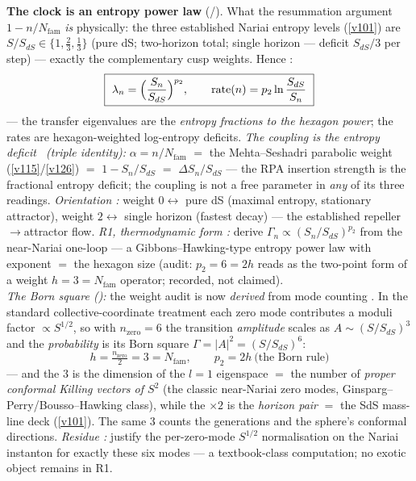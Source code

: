 \documentclass[11pt,a4paper]{article}
\newcommand{\Nfam}{N_{\mathrm{fam}}}
\begin{document}
\par\smallskip\noindent\textbf{The clock is an entropy power law} (\mE/\mC).
What the resummation argument $1-n/\Nfam$ \emph{is} physically: the three established Nariai entropy
levels (\vref{v101}) are $S/S_{dS}\in\{1,\tfrac23,\tfrac13\}$ (pure dS; two-horizon total; single horizon ---
deficit $S_{dS}/3$ per step) --- exactly the complementary cusp weights. Hence \mE:
\[
  \boxed{\ \lambda_n=\Bigl(\frac{S_n}{S_{dS}}\Bigr)^{p_2},\qquad
  \mathrm{rate}(n)=p_2\ln\frac{S_{dS}}{S_n}\ }
\]
--- the transfer eigenvalues are the \emph{entropy fractions to the hexagon power}; the rates are
hexagon-weighted log-entropy deficits. \emph{The coupling is the entropy deficit \mE\ (triple
identity):} $\alpha=n/\Nfam$ $=$ the Mehta--Seshadri parabolic weight (\vref{v115}/\vref{v126}) $=$
$1-S_n/S_{dS}$ $=$ $\Delta S_n/S_{dS}$ --- the RPA insertion strength is the fractional entropy
deficit; the coupling is not a free parameter in \emph{any} of its three readings. \emph{Orientation
\mE:} weight $0\leftrightarrow$ pure dS (maximal entropy, stationary attractor), weight
$2\leftrightarrow$ single horizon (fastest decay) --- the established repeller$\to$attractor flow.
\emph{R1, thermodynamic form \mC:} derive $\Gamma_n\propto(S_n/S_{dS})^{p_2}$ from the near-Nariai
one-loop --- a Gibbons--Hawking-type entropy power law with exponent $=$ the hexagon size (audit:
$p_2=6=2h$ reads as the two-point form of a weight $h=3=\Nfam$ operator; recorded, not claimed).
\smallskip\\
\noindent\emph{The Born square ():} the weight audit is now \emph{derived}
from mode counting \mE. In the standard collective-coordinate treatment each zero mode contributes a
moduli factor $\propto S^{1/2}$, so with $n_{\mathrm{zero}}=6$ the transition \emph{amplitude} scales
as $A\sim(S/S_{dS})^{3}$ and the \emph{probability} is its Born square $\Gamma=|A|^2=(S/S_{dS})^{6}$:
\[
  \boxed{\ h=\tfrac{n_{\mathrm{zero}}}2=3=\Nfam,\qquad p_2=2h\ \text{(the Born rule)}\ }
\]
--- and the $3$ is the dimension of the $l{=}1$ eigenspace $=$ the number of \emph{proper conformal
Killing vectors of $S^2$} (the classic near-Nariai zero modes, Ginsparg--Perry/Bousso--Hawking class),
while the $\times2$ is the \emph{horizon pair} $=$ the SdS mass-line deck (\vref{v101}). The same $3$ counts
the generations and the sphere's conformal directions. \emph{Residue \mC:} justify the per-zero-mode
$S^{1/2}$ normalisation on the Nariai instanton for exactly these six modes --- a textbook-class
computation; no exotic object remains in R1.
\end{document}
